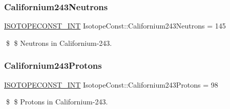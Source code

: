 \subsubsection{\texorpdfstring{Californium243\+Neutrons}{Californium243Neutrons}}
{\footnotesize\ttfamily \mbox{\hyperlink{group___isotope_const-_macros_ga5f18360b3e99483a35c32d789e62621c}{I\+S\+O\+T\+O\+P\+E\+C\+O\+N\+S\+T\+\_\+\+I\+NT}} Isotope\+Const\+::\+Californium243\+Neutrons = 145}

\$ \$ Neutrons in Californium-\/243. \mbox{\label{group___isotope_const-_californium-_cf243_ga1e7c20d1537035c728288aaf169a5b1b}} 
\subsubsection{\texorpdfstring{Californium243\+Protons}{Californium243Protons}}
{\footnotesize\ttfamily \mbox{\hyperlink{group___isotope_const-_macros_ga5f18360b3e99483a35c32d789e62621c}{I\+S\+O\+T\+O\+P\+E\+C\+O\+N\+S\+T\+\_\+\+I\+NT}} Isotope\+Const\+::\+Californium243\+Protons = 98}

\$ \$ Protons in Californium-\/243. 